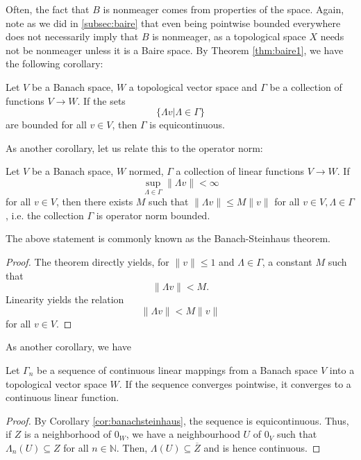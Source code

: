 \documentclass[twoside,symmetric, openany, 12pt]{./tuftebook}
\theoremstyle{definition}
\theoremstyle{definition}
\theoremstyle{definition}
\newcommand{\N}{\mathbb{N}}
\begin{document}
Often, the fact that $B$ is nonmeager comes from properties of the space. Again, note as we did in \ref{subsec:baire} that even being pointwise bounded everywhere does not necessarily imply that $B$ is nonmeager, as a topological space $X$ needs not be nonmeager unless it is a Baire space. By Theorem \ref{thm:baire1}, we have the following corollary:
\begin{Corollary}
	Let $V$ be a Banach space, $W$ a topological vector space and $\Gamma$ be a collection of functions $V\to W$. If the sets
	\[\{\Lambda v| \Lambda\in \Gamma\}\]
	are bounded for all $v\in V$, then $\Gamma$ is equicontinuous. 
\end{Corollary}
As another corollary, let us relate this to the operator norm:
\begin{Corollary}\label{cor:banachsteinhaus}
	Let $V$ be a Banach space, $W$ normed, $\Gamma$ a collection of linear functions $V\to W$. If
	\[\sup_{\Lambda\in \Gamma}\| \Lambda v\| < \infty\]
	for all $v\in V$, then there exists $M$ such that $\| \Lambda v\| \le M \|v\|$ for all $v\in V, \Lambda\in \Gamma$, i.e. the collection $\Gamma$ is operator norm bounded.
\end{Corollary}
The above statement is commonly known as the Banach-Steinhaus theorem.
\begin{proof}
	The theorem directly yields, for $\|v \| \le 1$ and $\Lambda\in \Gamma$, a constant $M$ such that
	\[\|\Lambda v\| < M.\]
	Linearity yields the relation
	\[\| \Lambda v\| < M \|v\|\]
	for all $v\in V$.
\end{proof}
As another corollary, we have
\begin{Corollary}
	Let $\Gamma_n$ be a sequence of continuous linear mappings from a Banach space $V$ into a topological vector space $W$. If the sequence converges pointwise, it converges to a continuous linear function.
\end{Corollary}
\begin{proof}
	By Corollary \ref{cor:banachsteinhaus}, the sequence is equicontinuous. Thus, if $Z$ is a neighborhood of $0_W$, we have a neighbourhood $U$ of $0_V$ such that $\Lambda_n(U)\subseteq Z$ for all $n\in \N$. Then, $\Lambda(U)\subseteq \overline{Z}$ and is hence continuous. 
\end{proof}
\end{document}

